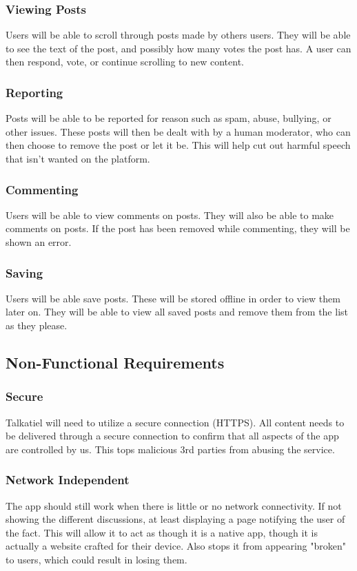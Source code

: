\documentclass[12pt]{article}
\begin{document}
\subsubsection{Viewing Posts}
Users will be able to scroll through posts made by others users.  They will be able to see the text of the post, and possibly how many votes the post has.  A user can then respond, vote, or continue scrolling to new content.
\subsubsection{Reporting}
Posts will be able to be reported for reason such as spam, abuse, bullying, or other issues.  These posts will then be dealt with by a human moderator, who can then choose to remove the post or let it be.  This will help cut out harmful speech that isn’t wanted on the platform.
\subsubsection{Commenting}
Users will be able to view  comments on posts. They will also be able to make comments on posts. If the post has been removed while commenting, they will be shown an error.
\subsubsection{Saving}
Users will be able save posts. These will be stored offline in order to view them later on. They will be able to view all saved posts and remove them from the list as they please.
\subsection{Non-Functional Requirements}
\subsubsection{Secure}
Talkatiel will need to utilize a secure connection (HTTPS).
All content needs to be delivered through a secure connection to confirm that all aspects of the app are controlled by us.  This tops malicious 3rd parties from abusing the service.
\subsubsection{Network Independent}
The app should still work when there is little or no network connectivity.
If not showing the different discussions, at least displaying a page notifying the user of the fact.  This will allow it to act as though it is a native app, though it is actually a website crafted for their device.  Also stops it from appearing "broken" to users, which could result in losing them.
\end{document}
